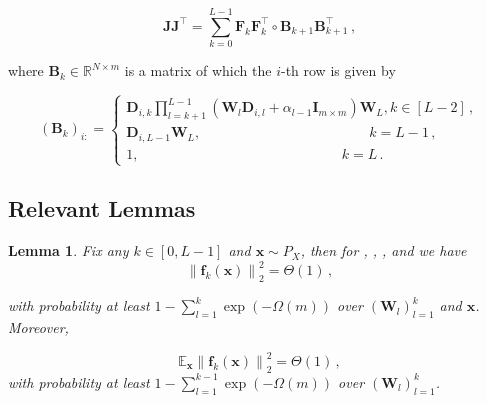\documentclass[nohyperref]{article}
\theoremstyle{plain}
\newtheorem{lemma}{Lemma}
\theoremstyle{definition}
\theoremstyle{remark}
\begin{document}
\begin{equation*}
\bm{JJ}^{\top}=\sum_{k=0}^{L-1}\bm{F}_k\bm{F}_k^{\top}\circ \bm{B}_{k+1}\bm{B}_{k+1}^{\top}\,,
\end{equation*}

where $\bm B_k \in \mathbb{R}^{N \times m}$ is a matrix of which the $i$-th row is given by

\begin{equation*}
(\bm{B}_k)_{i:}=\left\{\begin{matrix}
\bm{D}_{i,k}\prod _{l=k+1}^{L-1}(\bm{W}_l \bm{D}_{i,l}+\alpha_{l-1}\bm{I}_{m\times m})\bm{W}_L, k \in [L-2]\,,\\
\bm{D}_{i,L-1} \bm{W}_L,\qquad\qquad\qquad\qquad\qquad\qquad k = L-1\,,\\ 
1,\qquad\qquad\qquad\qquad\qquad\qquad\qquad\ \  k = L\,.
\end{matrix}\right.
\label{eq:NTK_finite_3}
\end{equation*}


\subsection{Relevant Lemmas}
\label{ssec:relevant_lemmas_finitely_width}

\begin{lemma}
\label{lemma:lemma_C.1_in_ICML}
Fix any $k \in [0,L-1] $ and $\bm{x}\sim P_X$, then for , , ,  and  we have
\begin{equation*}
\left \| \bm{f}_k(\bm{x}) \right \|_2^2 = \Theta (1)\,,
\end{equation*}

with probability at least $1-\sum_{l=1}^{k}\exp(-\Omega (m))$ over $(\bm{W}_l)_{l=1}^k$ and $\bm{x}$. Moreover,

\begin{equation*}
\mathbb{E}_{\bm{x}}\left \| \bm{f}_k(\bm{x}) \right \|_2^2 = \Theta (1)\,,
\end{equation*}
with probability at least $1-\sum_{l=1}^{k-1}\exp(-\Omega (m))$ over $(\bm{W}_l)_{l=1}^k$.


\end{lemma}
\end{document}

